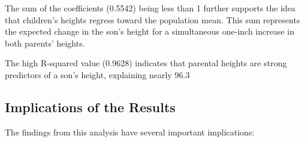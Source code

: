 \documentclass[12pt]{article}
\begin{document}
The sum of the coefficients (0.5542) being less than 1 further supports the idea that children's heights regress toward the population mean. This sum represents the expected change in the son's height for a simultaneous one-inch increase in both parents' heights.

The high R-squared value (0.9628) indicates that parental heights are strong predictors of a son's height, explaining nearly 96.3%

\subsection{Implications of the Results}

The findings from this analysis have several important implications:
\end{document}
